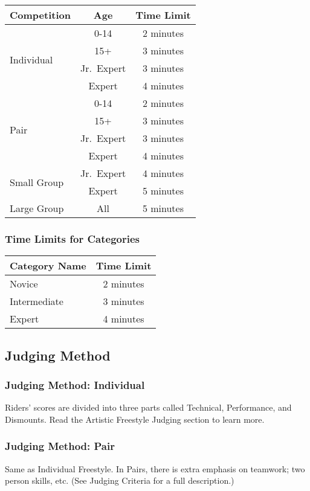\begin{tabular}{|l|c|c|}
\hline
\textbf{Competition} & \textbf{Age} & \textbf{Time Limit} \\
\hline
\multirow{4}{*}{Individual} & 0-14 & 2 minutes \\
\cline{2-3}
& 15+ & 3 minutes \\
\cline{2-3}
& Jr.~Expert & 3 minutes \\
\cline{2-3}
& Expert & 4 minutes \\
\hline
\multirow{4}{*}{Pair} & 0-14 & 2 minutes \\
\cline{2-3}
& 15+ & 3 minutes \\
\cline{2-3}
& Jr.~Expert & 3 minutes \\
\cline{2-3}
& Expert & 4 minutes \\
\hline
\multirow{2}{*}{Small Group} & Jr.~Expert & 4 minutes \\
\cline{2-3}
& Expert & 5 minutes \\
\hline
Large Group & All & 5 minutes \\
\hline
\end{tabular}

\subsubsection{Time Limits for Categories}
\begin{tabular}{|l|c|}
\hline
\textbf{Category Name} & \textbf{Time Limit} \\
\hline
Novice & 2 minutes \\
\hline
Intermediate & 3 minutes \\
\hline
Expert & 4 minutes \\
\hline
\end{tabular}


\subsection{Judging Method}

\subsubsection{Judging Method: Individual}
Riders' scores are divided into three parts called Technical, Performance, and Dismounts.
Read the Artistic Freestyle Judging section to learn more.

\subsubsection{Judging Method: Pair}
Same as Individual Freestyle.
In Pairs, there is extra emphasis on teamwork; two person skills, etc.
(See Judging Criteria for a full description.)

